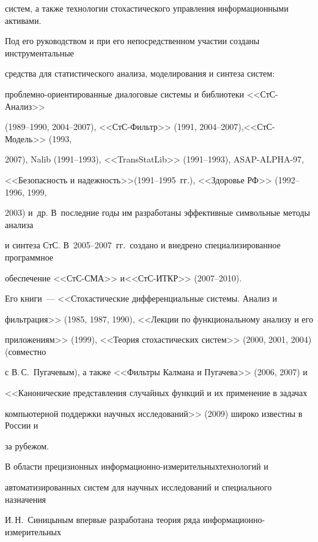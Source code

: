 систем, а также технологии стохастического управления информационными активами. 

Под его руководством и при его непосредственном учас\-тии созданы инструментальные 

средства для статистического анализа, моделирования и синтеза систем: 

     проб\-лем\-но-ориен\-ти\-ро\-ван\-ные диалоговые системы и библиотеки <<СтС-Анализ>>\linebreak 

(1989--1990, 2004--2007), <<СтС-Фильтр>> (1991, 2004--2007),\linebreak <<СтС-Модель>> (1993, 

2007), Nalib (1991--1993), <<TransStatLib>> (1991--1993),  ASAP-ALPHA-97, 

<<Безопасность и надежность>>\linebreak (1991--1995~гг.), <<Здоровье РФ>> (1992--1996, 1999, 

2003) и~др. В~последние годы им разработаны эффективные символьные методы анализа 

и синтеза СтС. В~2005--2007~гг.\ создано и внедрено специализированное программное 

обеспечение <<СтС-СМА>> и\linebreak <<СтС-ИТКР>> (2007--2010). 

     

     Его книги~--- <<Стохастические дифференциальные системы. Анализ и 

фильтрация>> (1985, 1987, 1990), <<Лекции по функциональному анализу и его 

приложениям>> (1999), <<Теория стохастических систем>> (2000, 2001, 2004) (совместно 

с В.\,С.~Пугачевым), а также <<Фильтры Калмана и Пугачева>> (2006, 2007) и 

<<Канонические представления случайных функций и их применение в задачах 

компьютерной поддержки научных исследований>> (2009) широко известны в России и 

за рубежом.

     

     В области прецизионных информационно-измерительных\linebreak технологий и 

автоматизированных систем для научных исследований и специального назначения 

И.\,Н.~Синицыным впервые разработана теория ряда информационно-измерительных 

